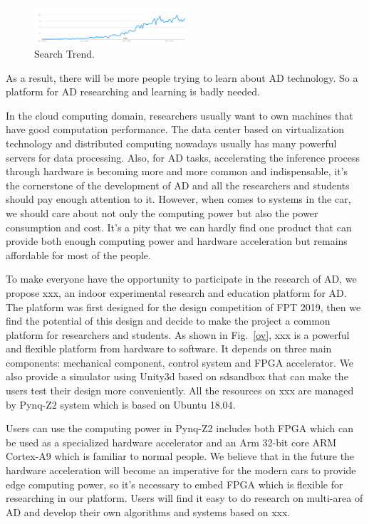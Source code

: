 \documentclass[conference]{IEEEtran}
\begin{document}
\begin{sloppypar}
\begin{figure}[htbp]
\centerline{\includegraphics[width=0.5\textwidth]{search_result.PNG}}
\caption{Search Trend.}
\label{st}
\end{figure}

As a result, there will be more people trying to learn about AD technology. So a platform for AD researching and learning is badly needed. 

In the cloud computing domain, researchers usually want to own machines that have good computation performance. The data center based on virtualization technology\cite{b2} and distributed computing\cite{b3} nowadays usually has many powerful servers for data processing. Also, for AD tasks, accelerating the inference process through hardware is becoming more and more common and indispensable, it's the cornerstone of the development of AD and all the researchers and students should pay enough attention to it. However, when comes to systems in the car, we should care about not only the computing power but also the power consumption and cost. It's a pity that we can hardly find one product that can provide both enough computing power and hardware acceleration but remains affordable for most of the people.

To make everyone have the opportunity to participate in the research of AD, we propose xxx, an indoor experimental research and education platform for AD. The platform was first designed for the design competition of FPT 2019\cite{}, then we find the potential of this design and decide to make the project a common platform for researchers and students. As shown in Fig.~\ref{ov}, xxx is a powerful and flexible platform from hardware to software. It depends on three main components: mechanical component, control system and FPGA accelerator. We also provide a simulator using Unity3d\cite{b4} based on sdsandbox\cite{b5} that can make the users test their design more conveniently. All the resources on xxx are managed by Pynq-Z2\cite{b6} system which is based on Ubuntu 18.04\cite{b7}. 

Users can use the computing power in Pynq-Z2 includes both FPGA which can be used as a specialized hardware accelerator and an Arm 32-bit core ARM Cortex-A9\cite{b8} which is familiar to normal people. We believe that in the future the hardware acceleration will become an imperative for the modern cars to provide edge computing power, so it's necessary to embed FPGA which is flexible for researching in our platform. Users will find it easy to do research on multi-area of AD and develop their own algorithms and systems based on xxx.


\end{sloppypar}
\end{document}
